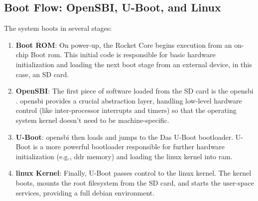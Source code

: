 \subsection{Boot Flow: OpenSBI, U-Boot, and Linux}
The system boots in several stages:
\begin{enumerate}
    \item \textbf{Boot ROM}: On power-up, the Rocket Core begins execution from an on-chip Boot \acrshort{rom}. This initial code is responsible for basic hardware initialization and loading the next boot stage from an external device, in this case, an SD card.
    \item \textbf{OpenSBI}: The first piece of software loaded from the SD card is the \acrfull{opensbi} \cite{opensbi_project}. \acrshort{opensbi} provides a crucial abstraction layer, handling low-level hardware control (like inter-processor interrupts and timers) so that the operating system kernel doesn't need to be machine-specific.
    \item \textbf{U-Boot}: \acrshort{opensbi} then loads and jumps to the Das U-Boot bootloader. U-Boot is a more powerful bootloader responsible for further hardware initialization (e.g., \acrshort{ddr} memory) and loading the \acrshort{linux} kernel into \acrshort{ram}.
    \item \textbf{\acrshort{linux} Kernel}: Finally, U-Boot passes control to the \acrshort{linux} kernel. The kernel boots, mounts the root filesystem from the SD card, and starts the user-space services, providing a full \acrshort{debian} environment.
\end{enumerate}

